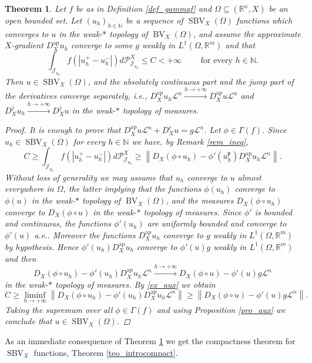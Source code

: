 \documentclass[12pt,a4paper]{amsart}
\theoremstyle{definition}
\theoremstyle{plain}
\newtheorem{teo}[defi]{Theorem}
\newcommand{\N}{\mathbb{N}}
\newcommand{\R}{\mathbb{R}}
\newcommand{\se}{\subseteq}
\newcommand{\leb}{\mathcal{L}}
\newcommand{\sbv}{\operatorname{SBV}}
\newcommand{\bv}{\operatorname{BV}}
\newcommand{\J}{\mathcal{J}}
\newcommand{\nl}{\left\|}
\newcommand{\nr}{\right\|}
\newcommand{\ap}{{\operatorname{ap}}}
\newcommand{\p}{{\mathfrak{p}}}
\begin{document}
\begin{teo}\label{teo_prec}
 Let $f$ be as in Definition \ref{def_gammaf} and $\Omega \se (\R^n,X)$ be an open bounded set. Let $(u_h)_{h \in \N}$ be a sequence of $\sbv_X(\Omega)$ functions which converges to $u$ in the weak-$*$ topology of $\bv_X(\Omega)$, and assume the approximate $X$-gradient $D^\ap_Xu_h$ converge to some $g$ weakly in $L^1(\Omega,\R^m)$ and that 
    \[
    \int_{\J_{u_h}}f(|u^+_h-u^-_h|)d\mathcal{P}^X_{\J_{u_h}} \leq C <+\infty \qquad \text{ for every }h \in \N.
    \]
 Then $u \in \sbv_X(\Omega)$, and the absolutely continuous part and the jump part of the derivatives converge separately, i.e.,  $D^\ap_Xu_h \leb^n \xrightarrow{h \to +\infty}D^\ap_Xu\leb^n$ and $D_X^ju_h \xrightarrow{h \to +\infty}D_X^ju$ in the weak-$*$ topology of measures.

\begin{proof}
    It is enough to prove that $D^\ap_Xu \leb^n+D^c_Xu=g \leb^n$. Let $\phi \in \Gamma(f)$. Since $u_h \in \sbv_X(\Omega)$ for every $h \in \N$ we have, by Remark \ref{rem_ineq},
    \begin{equation}\label{ex_aux}
    C \geq \int_{\J_{u_h}}f(|u_h^+-u^-_h|)d \mathcal{P}^X_{\J_{u_h}} \geq \nl D_X(\phi \circ u_h)-\phi'(u_h^\p)D^\ap_Xu_h\leb^n \nr.
    \end{equation}
Without loss of generality we may assume that $u_h$ converge to $u$ almost everywhere in $\Omega$, the latter implying that the functions $\phi(u_h)$ converge to $\phi(u)$ in the weak-$*$ topology of $\bv_X(\Omega)$, and the measures $D_X(\phi \circ u_h)$ converge to $D_X(\phi \circ u)$ in the weak-$*$ topology of measures. Since $\phi'$ is bounded and continuous, the functions $\phi'(u_h)$ are uniformly bounded and converge to $\phi'(u)$ a.e.. Moreover the functions $D^\ap_Xu_h$ converge to $g$ weakly in $L^1(\Omega,\R^m)$ by hypothesis. Hence $\phi'(u_h)D^\ap_Xu_h$ converge to $\phi'(u)g$ weakly in $L^1(\Omega,\R^m)$ and then
\[
D_X(\phi \circ u_h)-\phi'(u_h)D^\ap_Xu_h \leb^n \xrightarrow{h \to +\infty}D_X(\phi \circ u)-\phi'(u)g\leb^n
\]
in the weak-$*$ topology of measures. By \eqref{ex_aux} we obtain
\[
C \geq \liminf_{h \to +\infty}\nl D_X(\phi \circ u_h)-\phi'(u_h)D^\ap_Xu_h\leb^n \nr \geq \nl D_X(\phi \circ  u)-\phi'(u)g\leb^n \nr.
\]
Taking the supremum over all $\phi \in \Gamma(f)$ and using Proposition \ref{pro_aux} we conclude that $u \in \sbv_X(\Omega)$.
\end{proof}
\end{teo}
As an immediate consequence of Theorem \ref{teo_prec} we get the compactness theorem for $\sbv_X$ functions, Theorem \ref{teo_introcompact}.
\end{document}
